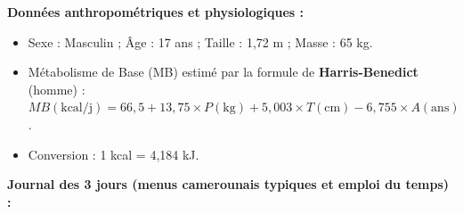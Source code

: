 \documentclass[11pt]{article}
\begin{document}
\par
\textbf{Données anthropométriques et physiologiques :}
\begin{itemize}
    \item Sexe : Masculin ; Âge : 17 ans ; Taille : 1,72 m ; Masse : 65 kg.
    \item Métabolisme de Base (MB) estimé par la formule de \textbf{Harris-Benedict} (homme) :
    $MB (\text{kcal/j}) = 66,5 + 13,75 \times P(\text{kg}) + 5,003 \times T(\text{cm}) - 6,755 \times A(\text{ans})$.
    \item Conversion : 1 kcal = 4,184 kJ.
\end{itemize}

\par
\textbf{Journal des 3 jours (menus camerounais typiques et emploi du temps) :}
\end{document}
